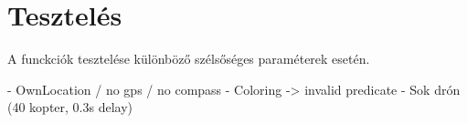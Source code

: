 \section{Tesztelés}

A funckciók tesztelése különböző szélsőséges paraméterek esetén.

 - OwnLocation / no gps / no compass
 - Coloring -> invalid predicate
 - Sok drón (40 kopter, 0.3s delay)
